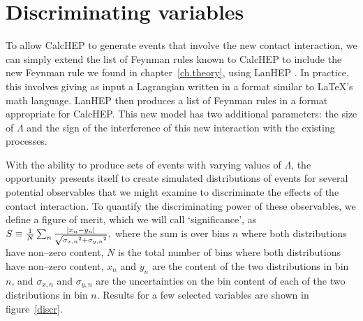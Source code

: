 \section{Discriminating variables}
To allow CalcHEP to generate events that involve the new contact interaction, we can simply extend the list of Feynman rules known to CalcHEP to include the new Feynman rule we found in chapter~\ref{ch.theory}, using LanHEP \cite{lanhep}. In practice, this involves giving as input a Lagrangian written in a format similar to \LaTeX's math language. LanHEP then produces a list of Feynman rules in a format appropriate for CalcHEP. This new model has two additional parameters: the size of $\Lambda$ and the sign of the interference of this new interaction with the existing processes.

With the ability to produce sets of events with varying values of $\Lambda$, the opportunity presents itself to create simulated distributions of events for several potential observables that we might examine to discriminate the effects of the contact interaction. To quantify the discriminating power of these observables, we define a figure of merit, which we will call `significance', as
\(S\equiv\frac{1}{N}\sum_n \frac{|x_n-y_n|}{\sqrt{{\sigma_{x,n}}^2+{\sigma_{y,n}}^2}},\label{significance}\)
where the sum is over bins $n$ where both distributions have non--zero content, $N$ is the total number of bins where both distributions have non--zero content, $x_n$ and $y_n$ are the content of the two distributions in bin $n$, and $\sigma_{x,n}$ and $\sigma_{y,n}$ are the uncertainties on the bin content of each of the two distributions in bin $n$.
Results for a few selected variables are shown in figure~\ref{discr}.

